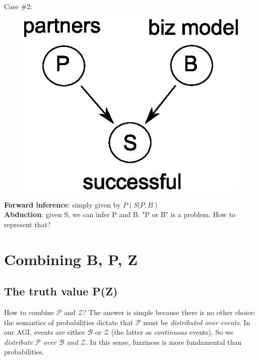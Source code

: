 Case \#2:
\begin{figure}[H]
\centering
\includegraphics{BayesNet-successful-business.eps}
\end{figure}
\textbf{Forward inference}: simply given by $P(S|P,B)$\\
\textbf{Abduction}: given S, we can infer P and B.  "P or B" is a problem. How to represent that?  

\section{Combining B, P, Z}
\label{sec:combinePZ}

\subsection{The truth value P(Z)}

How to combine $\mathcal{P}$ and $\mathcal{Z}$?  The answer is simple because there is no other choice:  the semantics of probabilities dictate that $\mathcal{P}$ must be \textit{distributed over events}.  In our AGI, events are either $\mathcal{B}$ or $\mathcal{Z}$ (the latter as \textit{continuous} events).  So we \emph{distribute $\mathcal{P}$ over $\mathcal{B}$ and $\mathcal{Z}$}.  In this sense, fuzziness is more fundamental than probabilities.


